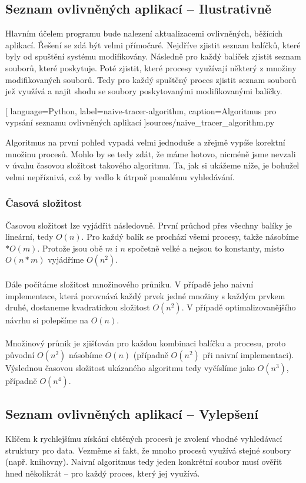 \documentclass[
  field=inf,
  biblatex,
  glossaries,
  index
]{kidiplom}
\begin{document}
	\subsection{Seznam ovlivněných aplikací -- Ilustrativně}
	Hlavním účelem programu bude nalezení aktualizacemi ovlivněných, běžících aplikací. Řešení se zdá být velmi přímočaré. Nejdříve zjistit seznam balíčků, které byly od spuštění systému modifikovány. Následně pro každý balíček zjistit seznam souborů, které poskytuje. Poté zjistit, které procesy využívají některý z množiny modifikovaných souborů. Tedy pro každý spuštěný proces zjistit seznam souborů jež využívá a najít shodu se soubory poskytovanými modifikovanými balíčky.

	
	[
		language={Python},
		label=naive-tracer-algorithm,
		caption={Algoritmus pro vypsání seznamu ovlivněných aplikací}
	]{sources/naive_tracer_algorithm.py}

	Algoritmus na první pohled vypadá velmi jednoduše a zřejmě vypíše korektní množinu procesů. Mohlo by se tedy zdát, že máme hotovo, nicméně jsme nevzali v úvahu časovou složitost takového algoritmu. Ta, jak si ukážeme níže, je bohužel velmi nepříznivá, což by vedlo k útrpně pomalému vyhledávání.

		\subsubsection*{Časová složitost}
		Časovou složitost lze vyjádřit následovně. První průchod přes všechny balíky je lineární, tedy $O(n)$. Pro každý balík se prochází všemi procesy, takže násobíme $* O(m)$. Protože jsou obě $m$ i $n$ spočetně velké a nejsou to konstanty, místo $O(n*m)$ vyjádříme $O(n^2)$.
		\\
		\\
		Dále počítáme složitost množinového průniku. V případě jeho naivní implementace, která porovnává každý prvek jedné množiny s každým prvkem druhé, dostaneme kvadratickou složitost $O(n^2)$. V případě optimalizovanějšího návrhu si polepšíme na $O(n)$.
		\\
		\\
		Množinový průnik je zjišťován pro každou kombinaci balíčku a procesu, proto původní $O(n^2)$ násobíme $O(n)$ (případně $O(n^2)$ při naivní implementaci). Výslednou časovou složitost ukázaného algoritmu tedy vyčíslíme jako $O(n^3)$, případně $O(n^4)$.

	\subsection{Seznam ovlivněných aplikací -- Vylepšení}
	Klíčem k rychlejšímu získání chtěných procesů je zvolení vhodné vyhledávací struktury pro data. Vezměme si fakt, že mnoho procesů využívá stejné soubory (např. knihovny). Naivní algoritmus tedy jeden konkrétní soubor musí ověřit hned několikrát -- pro každý proces, který jej využívá.
\end{document}
